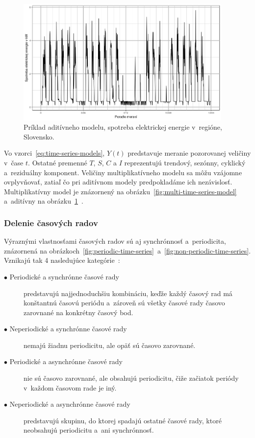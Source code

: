 \documentclass[a4paper,twoside,slovak,12pt,appendix]{article}
\begin{document}
\begin{figure}[htbp]
  \centering
  \includegraphics[width=0.95\textwidth]{add_model.png}
  \caption[Príklad aditívneho modelu.]{Príklad aditívneho modelu, spotreba elektrickej energie v~regióne, Slovensko.}
  \label{fig:add-time-series-model}
\end{figure}

\noindent
Vo vzorci~\ref{eq:time-series-models}, $Y(t)$ predstavuje meranie pozorovanej
veličiny v~čase $t$. Ostatné premenné $T$, $S$, $C$ a $I$ reprezentujú trendový,
sezónny, cyklický a~reziduálny komponent. Veličiny multiplikatívneho modelu sa
môžu vzájomne ovplyvňovať, zatiaľ čo pri aditívnom modely predpokladáme ich
nezávislosť. Multiplikatívny model je znázornený na
obrázku~\ref{fig:multi-time-series-model} a~aditívny na
obrázku~\ref{fig:add-time-series-model}~\cite{Agrawal2013}.


\subsubsection{Delenie časových radov}
Výraznými vlastnosťami časových radov sú aj synchrónnosť a~periodicita,
znázornená na
obrázkoch~\ref{fig:periodic-time-series}~a~\ref{fig:non-periodic-time-series}.
Vznikajú tak 4 nasledujúce kategórie~\cite{Teng2010}:
\begin{description}
  \item[$\bullet$ Periodické a synchrónne časové rady] predstavujú
	najjednoduchšiu kombináciu, keďže každý časový rad má konštantnú časovú
	periódu a~zároveň sú všetky časové rady časovo zarovnané na konkrétny časový
	bod.
  \item[$\bullet$ Neperiodické a synchrónne časové rady] nemajú žiadnu
	periodicitu, ale opäť sú časovo zarovnané.
  \item[$\bullet$ Periodické a asynchrónne časové rady] nie sú časovo zarovnané,
	ale obsahujú periodicitu, čiže začiatok periódy v~každom časovom rade je iný.
  \item[$\bullet$ Neperiodické a asynchrónne časové rady] predstavujú skupinu,
	do ktorej spadajú ostatné časové rady, ktoré neobsahujú periodicitu a~ani
	synchrónnosť.
\end{description}
\end{document}
